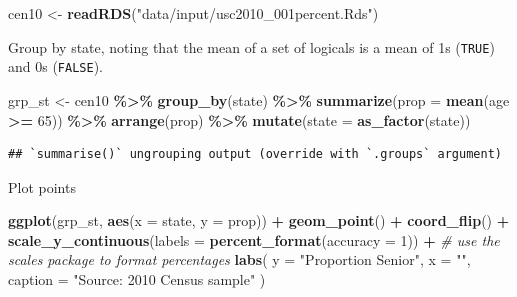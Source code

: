 \documentclass[
]{book}
\newenvironment{Shaded}{\begin{snugshade}}{\end{snugshade}}
\newcommand{\CommentTok}[1]{\textcolor[rgb]{0.56,0.35,0.01}{\textit{#1}}}
\newcommand{\DataTypeTok}[1]{\textcolor[rgb]{0.13,0.29,0.53}{#1}}
\newcommand{\DecValTok}[1]{\textcolor[rgb]{0.00,0.00,0.81}{#1}}
\newcommand{\KeywordTok}[1]{\textcolor[rgb]{0.13,0.29,0.53}{\textbf{#1}}}
\newcommand{\NormalTok}[1]{#1}
\newcommand{\OperatorTok}[1]{\textcolor[rgb]{0.81,0.36,0.00}{\textbf{#1}}}
\newcommand{\StringTok}[1]{\textcolor[rgb]{0.31,0.60,0.02}{#1}}
\theoremstyle{definition}
\theoremstyle{definition}
\theoremstyle{definition}
\theoremstyle{remark}
\begin{document}
\begin{Shaded}
\begin{Highlighting}[]
\NormalTok{cen10 <{-}}\StringTok{ }\KeywordTok{readRDS}\NormalTok{(}\StringTok{"data/input/usc2010\_001percent.Rds"}\NormalTok{)}
\end{Highlighting}
\end{Shaded}

Group by state, noting that the mean of a set of logicals is a mean of 1s (\texttt{TRUE}) and 0s (\texttt{FALSE}).

\begin{Shaded}
\begin{Highlighting}[]
\NormalTok{grp\_st <{-}}\StringTok{ }\NormalTok{cen10 }\OperatorTok{\%>\%}
\StringTok{  }\KeywordTok{group\_by}\NormalTok{(state) }\OperatorTok{\%>\%}
\StringTok{  }\KeywordTok{summarize}\NormalTok{(}\DataTypeTok{prop =} \KeywordTok{mean}\NormalTok{(age }\OperatorTok{>=}\StringTok{ }\DecValTok{65}\NormalTok{)) }\OperatorTok{\%>\%}
\StringTok{  }\KeywordTok{arrange}\NormalTok{(prop) }\OperatorTok{\%>\%}
\StringTok{  }\KeywordTok{mutate}\NormalTok{(}\DataTypeTok{state =} \KeywordTok{as\_factor}\NormalTok{(state))}
\end{Highlighting}
\end{Shaded}

\begin{verbatim}
## `summarise()` ungrouping output (override with `.groups` argument)
\end{verbatim}

Plot points

\begin{Shaded}
\begin{Highlighting}[]
\KeywordTok{ggplot}\NormalTok{(grp\_st, }\KeywordTok{aes}\NormalTok{(}\DataTypeTok{x =}\NormalTok{ state, }\DataTypeTok{y =}\NormalTok{ prop)) }\OperatorTok{+}
\StringTok{  }\KeywordTok{geom\_point}\NormalTok{() }\OperatorTok{+}
\StringTok{  }\KeywordTok{coord\_flip}\NormalTok{() }\OperatorTok{+}
\StringTok{  }\KeywordTok{scale\_y\_continuous}\NormalTok{(}\DataTypeTok{labels =} \KeywordTok{percent\_format}\NormalTok{(}\DataTypeTok{accuracy =} \DecValTok{1}\NormalTok{)) }\OperatorTok{+}\StringTok{ }\CommentTok{\# use the scales package to format percentages}
\StringTok{  }\KeywordTok{labs}\NormalTok{(}
    \DataTypeTok{y =} \StringTok{"Proportion Senior"}\NormalTok{,}
    \DataTypeTok{x =} \StringTok{""}\NormalTok{,}
    \DataTypeTok{caption =} \StringTok{"Source: 2010 Census sample"}
\NormalTok{  )}
\end{Highlighting}
\end{Shaded}
\end{document}
